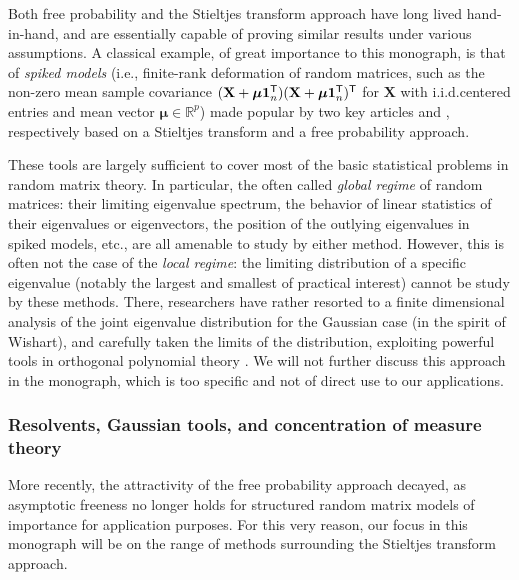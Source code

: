 \documentclass[MAL,biber]{nowfnt} %
\newcommand{\T}{{\sf T}}
\newcommand{\X}{{\mathbf{X}}}
\newcommand{\bmu}{{ \boldsymbol{\mu} }}
\newcommand{\one}{{\mathbf{1}}}
\newcommand{\RR}{{\mathbb{R}}}
\begin{document}
Both free probability and the Stieltjes transform approach have long lived hand-in-hand, and are essentially capable of proving similar results under various assumptions. A classical example, of great importance to this monograph, is that of \emph{spiked models} (i.e., finite-rank deformation of random matrices, such as the non-zero mean sample covariance $(\X+\bmu \one_n^\T)(\X+\bmu \one_n^\T)^\T$ for $\X$ with i.i.d.\@ centered entries and mean vector $\bmu \in\RR^p$) made popular by two key articles \citep{baik2006eigenvalues} and \citep{benaych2012singular}, respectively based on a Stieltjes transform and a free probability approach.

These tools are largely sufficient to cover most of the basic statistical problems in random matrix theory. In particular, the often called \emph{global regime} of random matrices: their limiting eigenvalue spectrum, the behavior of linear statistics of their eigenvalues or eigenvectors, the position of the outlying eigenvalues in spiked models, etc., are all amenable to study by either method. However, this is often not the case of the \emph{local regime}: the limiting distribution of a specific eigenvalue (notably the largest and smallest of practical interest) cannot be study by these methods. There, researchers have rather resorted to a finite dimensional analysis of the joint eigenvalue distribution for the Gaussian case (in the spirit of Wishart), and carefully taken the limits of the distribution, exploiting powerful tools in orthogonal polynomial theory \citep{johnstone2001distribution}. We will not further discuss this approach in the monograph, which is too specific and not of direct use to our applications.

\subsubsection{Resolvents, Gaussian tools, and concentration of measure theory}
More recently, the attractivity of the free probability approach decayed, as asymptotic freeness no longer holds for structured random matrix models of importance for application purposes. For this very reason, our focus in this monograph will be on the range of methods surrounding the Stieltjes transform approach. 
\end{document}
